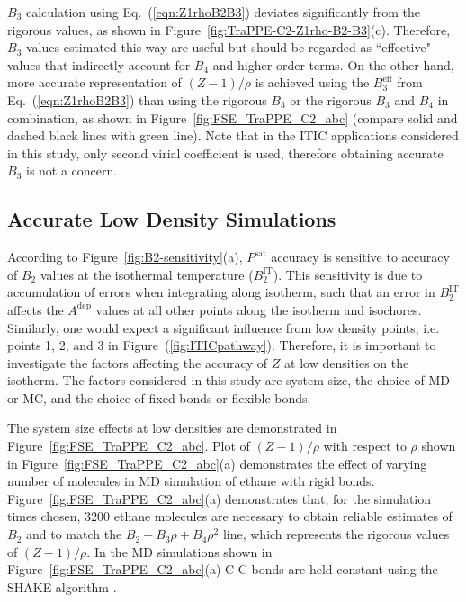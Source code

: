 \documentclass[5p,times]{elsarticle}
\begin{document}
$B_3$ calculation using Eq.~(\ref{eqn:Z1rhoB2B3}) deviates significantly from the rigorous values, as shown in Figure~\ref{fig:TraPPE-C2-Z1rho-B2-B3}(c). Therefore, $B_3$ values estimated this way are useful but should be regarded as ``effective" values that indirectly account for $B_4$ and higher order terms. On the other hand, more accurate representation of $(Z-1)/\rho$ is achieved using the $B_3^\mathrm{eff}$ from Eq.~(\ref{eqn:Z1rhoB2B3}) than using the rigorous $B_3$ or the rigorous $B_3$ and $B_4$ in combination, as shown in Figure~\ref{fig:FSE_TraPPE_C2_abc} (compare solid and dashed black lines with green line). Note that in the ITIC applications considered in this study, only second virial coefficient is used, therefore obtaining accurate $B_3$ is not a concern.

\subsection{Accurate Low Density Simulations}\label{sec:FSE}
According to Figure~\ref{fig:B2-sensitivity}(a), $P^{\mathrm{sat}}$ accuracy is sensitive to accuracy of $B_2$ values at the isothermal temperature ($B_2^{\mathrm{IT}}$). This sensitivity is due to accumulation of errors when integrating along isotherm, such that an error in $B_2^{\mathrm{IT}}$ affects the $A^{\mathrm{dep}}$ values at all other points along the isotherm and isochores. Similarly, one would expect a significant influence from low density points, i.e. points 1, 2, and 3 in Figure~(\ref{fig:ITICpathway}). Therefore, it is important to investigate the factors affecting the accuracy of $Z$ at low densities on the isotherm. The factors considered in this study are system size, the choice of MD or MC, and the choice of fixed bonds or flexible bonds. 

The system size effects at low densities are demonstrated in Figure~\ref{fig:FSE_TraPPE_C2_abc}. Plot of $(Z-1)/\rho$ with respect to $\rho$ shown in Figure~\ref{fig:FSE_TraPPE_C2_abc}(a) demonstrates the effect of varying number of molecules in MD simulation of ethane with rigid bonds. Figure~\ref{fig:FSE_TraPPE_C2_abc}(a) demonstrates that, for the simulation times chosen, 3200 ethane molecules are necessary to obtain reliable estimates of $B_2$ and to match the $B_2+B_3 \rho+B_4 \rho^2$ line, which represents the rigorous values of $(Z-1)/\rho$. In the MD simulations shown in Figure~\ref{fig:FSE_TraPPE_C2_abc}(a) C-C bonds are held constant using the SHAKE algorithm \cite{Ryckaert1977}. 
\end{document}
